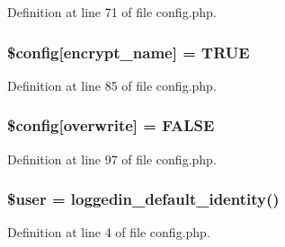 Definition at line 71 of file config.\+php.

\subsubsection[{\texorpdfstring{\$config}{$config}}]{\setlength{\rightskip}{0pt plus 5cm}\$config\mbox{[}\textquotesingle{}encrypt\+\_\+name\textquotesingle{}\mbox{]} = T\+R\+UE}\hypertarget{config_8php_a68ed88b056af10f4a497cd806017c0c5}{}\label{config_8php_a68ed88b056af10f4a497cd806017c0c5}


Definition at line 85 of file config.\+php.

\subsubsection[{\texorpdfstring{\$config}{$config}}]{\setlength{\rightskip}{0pt plus 5cm}\$config\mbox{[}\textquotesingle{}overwrite\textquotesingle{}\mbox{]} = F\+A\+L\+SE}\hypertarget{config_8php_a90847191a70a5f5968f94903fdc6311b}{}\label{config_8php_a90847191a70a5f5968f94903fdc6311b}


Definition at line 97 of file config.\+php.

\subsubsection[{\texorpdfstring{\$user}{$user}}]{\setlength{\rightskip}{0pt plus 5cm}\${\bf user} = loggedin\+\_\+default\+\_\+identity()}\hypertarget{config_8php_a598ca4e71b15a1313ec95f0df1027ca5}{}\label{config_8php_a598ca4e71b15a1313ec95f0df1027ca5}


Definition at line 4 of file config.\+php.

